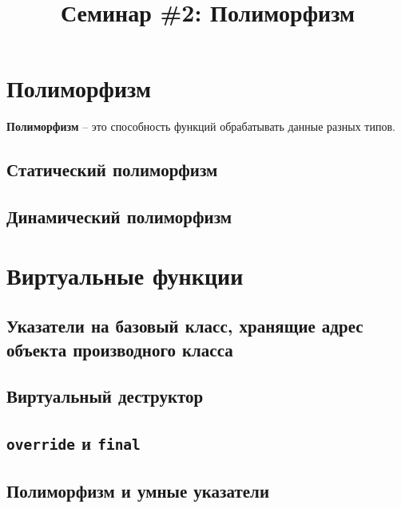 \documentclass{article}
\begin{document}
\title{Семинар \#2: Полиморфизм \vspace{-5ex}}\date{}\maketitle

\section*{Полиморфизм}
\textbf{Полиморфизм} -- это способность функций обрабатывать данные разных типов.
\subsection*{Статический полиморфизм}
\subsection*{Динамический полиморфизм}


\section*{Виртуальные функции}

\subsection*{Указатели на базовый класс, хранящие адрес объекта производного класса}


\subsection*{Виртуальный деструктор}

\subsection*{\texttt{override} и \texttt{final}}


\subsection*{Полиморфизм и умные указатели}

\newpage
\end{document}
